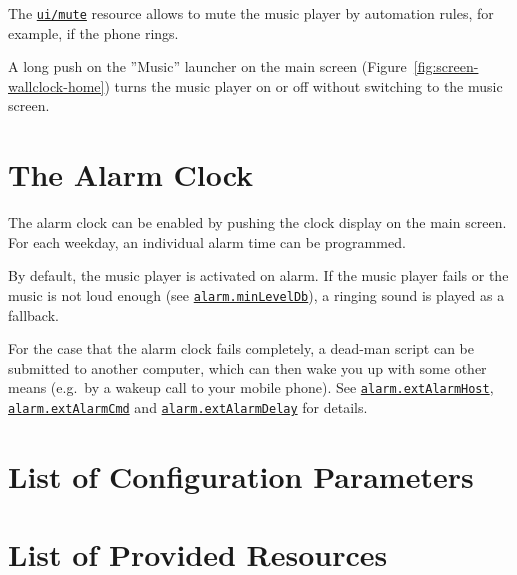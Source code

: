 \documentclass[12pt,english,parskip=half,headheight=19pt]{scrreprt}
\newcommand{\idx}[1]{#1\index{#1}}
\newcommand{\refenv}[1]{\hyperref[env:#1]{\texttt{#1}}}        %
\newcommand{\refrc}[1]{\hyperref[rc:#1]{\texttt{#1}}}
\begin{document}
The \refrc{ui/mute} resource allows to mute the music player by automation
rules, for example, if the phone rings.

A long push on the ''Music'' launcher on the main screen (Figure~\ref{fig:screen-wallclock-home})
turns the music player on or off without switching to the music screen.



\section{The Alarm Clock}
\label{sec:wallclock-alarmclock}

The alarm clock can be enabled by pushing the clock display on the main screen.
For each weekday, an individual alarm time can be programmed.

By default, the music player is activated on alarm. If the music player fails
or the music is not loud enough (see \refenv{alarm.minLevelDb}), a ringing
sound is played as a fallback.

For the case that the alarm clock fails completely, a dead-man script can
be submitted to another computer, which can then wake you up with some
other means (e.g.~by a wakeup call to your mobile phone).
See \refenv{alarm.extAlarmHost}, \refenv{alarm.extAlarmCmd} and \refenv{alarm.extAlarmDelay}
for details.



\section{List of Configuration Parameters}
\label{sec:wallclock-env}





\section{List of Provided Resources}
\label{sec:wallclock-rc}


\end{document}
